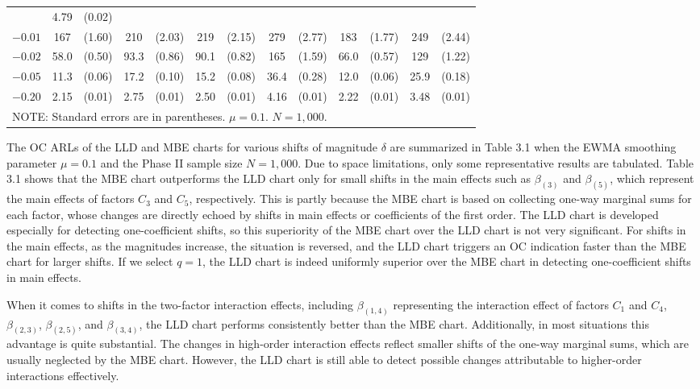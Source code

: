 \begin{table}[!ht]
\begin{tabular}{r|cccc|cccc|cccc}
& 4.79 & (0.02)
\\
$-0.01$ & 167 & (1.60) & 210 & (2.03) & 219 & (2.15) & 279 & (2.77) & 183 & (1.77) &
249 & (2.44)
\\
$-0.02$ & 58.0 & (0.50) & 93.3 & (0.86) & 90.1 & (0.82) & 165 & (1.59) & 66.0 &
(0.57) & 129 & (1.22)
\\
$-0.05$ & 11.3 & (0.06) & 17.2 & (0.10) & 15.2 & (0.08) & 36.4 & (0.28) & 12.0 &
(0.06) & 25.9 & (0.18)
\\
$-0.20$ & 2.15 & (0.01) & 2.75 & (0.01) & 2.50 & (0.01) & 4.16 & (0.01) & 2.22 &
(0.01) & 3.48 & (0.01)
\\\hline
\multicolumn{13}{l}{NOTE: Standard errors are in parentheses. $\mu=0.1$. $N=1,000$.}
\end{tabular}
\end{table}

The OC ARLs of the LLD and MBE charts for various shifts of magnitude $\delta$ are
summarized in Table 3.1 when the EWMA smoothing parameter $\mu=0.1$ and the Phase II
sample size $N=1,000$. Due to space limitations, only some representative results
are tabulated. Table 3.1 shows that the MBE chart outperforms the LLD chart only for
small shifts in the main effects such as $\beta_{(3)}$ and $\beta_{(5)}$, which
represent the main effects of factors $C_3$ and $C_5$, respectively. This is partly
because the MBE chart is based on collecting one-way marginal sums for each factor,
whose changes are directly echoed by shifts in main effects or coefficients of the
first order. The LLD chart is developed especially for detecting one-coefficient
shifts, so this superiority of the MBE chart over the LLD chart is not very
significant. For shifts in the main effects, as the magnitudes increase, the
situation is reversed, and the LLD chart triggers an OC indication faster than the
MBE chart for larger shifts. If we select $q=1$, the LLD chart is indeed uniformly
superior over the MBE chart in detecting one-coefficient shifts in main effects.

When it comes to shifts in the two-factor interaction effects, including
$\beta_{(1,4)}$ representing the interaction effect of factors $C_1$ and $C_4$,
$\beta_{(2,3)}$, $\beta_{(2,5)}$, and $\beta_{(3,4)}$, the LLD chart performs
consistently better than the MBE chart. Additionally, in most situations this
advantage is quite substantial. The changes in high-order interaction effects
reflect smaller shifts of the one-way marginal sums, which are usually neglected by
the MBE chart. However, the LLD chart is still able to detect possible changes
attributable to higher-order interactions effectively.

